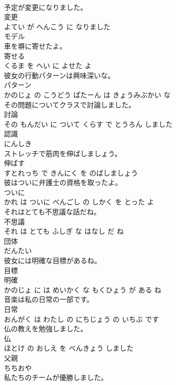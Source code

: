\documentclass[8pt]{extreport}
\begin{document}
\begin{CJK}{UTF8}{min}
\\	予定が変更になりました。	
\\	変更 
\\	よてい が へんこう に なりました			
\\	モデル	
\\	車を塀に寄せたよ。	
\\	寄せる 
\\	くるま を へい に よせた よ			
\\	彼女の行動パターンは興味深いな。	
\\	パターン 
\\	かのじょ の こうどう ぱたーん は きょうみぶかい な			
\\	その問題についてクラスで討論しました。	
\\	討論 
\\	その もんだい に ついて くらす で とうろん しました			
\\	認識	
\\	にんしき			
\\	ストレッチで筋肉を伸ばしましょう。	
\\	伸ばす 
\\	すとれっち で きんにく を のばしましょう			
\\	彼はついに弁護士の資格を取ったよ。	
\\	ついに 
\\	かれ は ついに べんごし の しかく を とった よ			
\\	それはとても不思議な話だね。	
\\	不思議 
\\	それ は とても ふしぎ な はなし だ ね			
\\	団体	
\\	だんたい			
\\	彼女には明確な目標があるね。	
\\	目標 
\\	明確 
\\	かのじょ に は めいかく な もくひょう が ある ね			
\\	音楽は私の日常の一部です。	
\\	日常 
\\	おんがく は わたし の にちじょう の いちぶ です			
\\	仏の教えを勉強しました。	
\\	仏 
\\	ほとけ の おしえ を べんきょう しました			
\\	父親	
\\	ちちおや			
\\	私たちのチームが優勝しました。	

\end{CJK}
\end{document}
